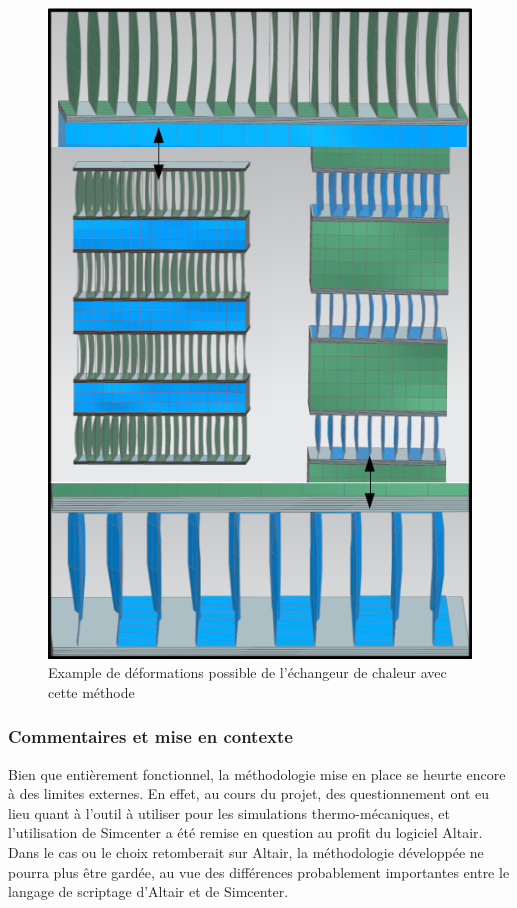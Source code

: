 \documentclass[a4paper,10pt]{article}
\begin{document}
\begin{figure}[H]
   \centering   
   \includegraphics[scale=0.5]{./exchangerPics/exchangerDeformations.png}
      \caption{Example de déformations possible de l'échangeur de chaleur avec cette méthode}
         \label{deformationsExchanger}
\end{figure}

\subsubsection{Commentaires et mise en contexte}

Bien que entièrement fonctionnel, la méthodologie mise en place se heurte encore à des limites externes. En effet, au cours du projet, des questionnement ont eu lieu quant à l'outil à utiliser pour les simulations thermo-mécaniques, et l'utilisation de Simcenter a été remise en question au profit du logiciel Altair.\\ 
Dans le cas ou le choix retomberait sur Altair, la méthodologie développée ne pourra plus être gardée, au vue des différences probablement importantes entre le langage de scriptage d'Altair et de Simcenter.\\ 
 
\end{document}
